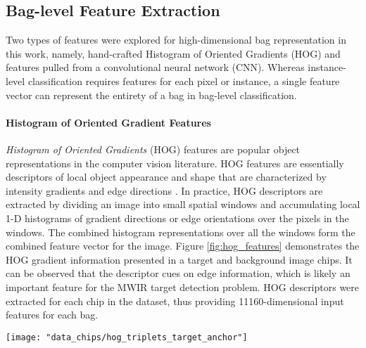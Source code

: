 \subsection{Bag-level Feature Extraction} \label{exp:bag_level_feature_extraction}
Two types of features were explored for high-dimensional bag representation in this work, namely, hand-crafted Histogram of Oriented Gradients (HOG) and features pulled from a convolutional neural network (CNN).  Whereas instance-level classification requires features for each pixel or instance, a single feature vector can represent the entirety of a bag in bag-level classification.

\paragraph{Histogram of Oriented Gradient Features} \textit{Histogram of Oriented Gradients} (HOG) features are popular object representations in the computer vision literature.  HOG features are essentially descriptors of local object appearance and shape that are characterized by intensity gradients and edge directions \citep{Dalal2005HOG}.  In practice, HOG descriptors are extracted by dividing an image into small spatial windows and accumulating local 1-D histograms of gradient directions or edge orientations over the pixels in the windows.  The combined histogram representations over all the windows form the combined feature vector for the image.  Figure \ref{fig:hog_features} demonstrates the HOG gradient information presented in a target and background image chips.  It can be observed that the descriptor cues on edge information, which is likely an important feature for the MWIR target detection problem.  HOG descriptors were extracted for each chip in the dataset, thus providing 11160-dimensional input features for each bag.  
\begin{center}
	\begin{figure*}[h]
		\centering
		\texttt{[image: "data\_chips/hog\_triplets\_target\_anchor"]}
		\caption[HOG features]{Example image chips and corresponding HOG gradient magnitude and direction features over the chip.  In the left column, the chips labeled as ``Anchor" and ``Positive" correspond to positive bags, while th image labeled ``Negative" represents a negative bag because it only contains background pixels.  The images in the right column demonstrate edge direction and magnitude calculated over 16x16 windows across the images.}
		\label{fig:hog_features}
	\end{figure*}
\end{center}
